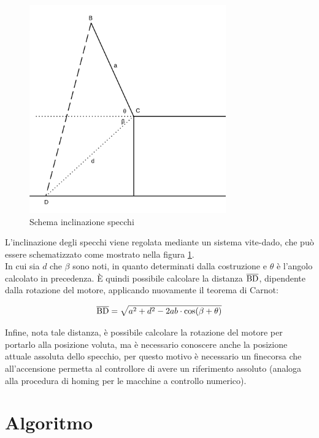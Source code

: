 \documentclass[12pt]{article}
\begin{document}
    \begin{figure}[h]
    \centering
        \includegraphics[width=240pt]{Draws/Linear_inclination_trig.png}
        \caption{Schema inclinazione specchi}
        \label{mirror_inclination_system}
    \end{figure}
    
    
    L'inclinazione degli specchi viene regolata mediante un sistema vite-dado, che può essere schematizzato come mostrato nella figura \ref{mirror_inclination_system}.\\
    
    In cui sia $d$ che $\beta$ sono noti, in quanto determinati dalla costruzione e $\theta$ è l'angolo calcolato in precedenza. È quindi possibile calcolare la distanza $\overline{\rm BD}$, dipendente dalla rotazione del motore, applicando nuovamente il teorema di Carnot:
    
    \begin{equation}
        \overline{\rm BD} = \sqrt{a^2 + d^2 - 2 a b \cdot \cos(\beta + \theta)}
    \end{equation}
    
    \vspace{1.5cm}
    
    Infine, nota tale distanza, è possibile calcolare la rotazione del motore per portarlo alla posizione voluta, ma è necessario conoscere anche la posizione attuale assoluta dello specchio, per questo motivo è necessario un finecorsa che all'accensione permetta al controllore di avere un riferimento assoluto (analoga alla procedura di homing per le macchine a controllo numerico).


\newpage
\section{Algoritmo}
\end{document}
